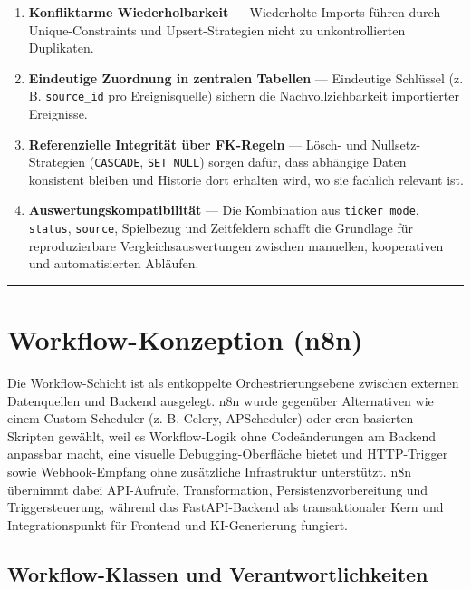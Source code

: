 \begin{enumerate}
\def\labelenumi{\arabic{enumi}.}
\tightlist
\item
  \textbf{Konfliktarme Wiederholbarkeit} --- Wiederholte Imports führen
  durch Unique-Constraints und Upsert-Strategien nicht zu
  unkontrollierten Duplikaten.
\item
  \textbf{Eindeutige Zuordnung in zentralen Tabellen} --- Eindeutige
  Schlüssel (z. B. \texttt{source\_id} pro Ereignisquelle) sichern die
  Nachvollziehbarkeit importierter Ereignisse.
\item
  \textbf{Referenzielle Integrität über FK-Regeln} --- Lösch- und
  Nullsetz-Strategien (\texttt{CASCADE}, \texttt{SET\ NULL}) sorgen
  dafür, dass abhängige Daten konsistent bleiben und Historie dort
  erhalten wird, wo sie fachlich relevant ist.
\item
  \textbf{Auswertungskompatibilität} --- Die Kombination aus
  \texttt{ticker\_mode}, \texttt{status}, \texttt{source}, Spielbezug
  und Zeitfeldern schafft die Grundlage für reproduzierbare
  Vergleichsauswertungen zwischen manuellen, kooperativen und
  automatisierten Abläufen.
\end{enumerate}

\begin{center}\rule{0.5\linewidth}{0.5pt}\end{center}

\section{Workflow-Konzeption (n8n)}\label{workflow-konzeption-n8n}

Die Workflow-Schicht ist als entkoppelte Orchestrierungsebene zwischen
externen Datenquellen und Backend ausgelegt. n8n wurde gegenüber
Alternativen wie einem Custom-Scheduler (z. B. Celery, APScheduler) oder
cron-basierten Skripten gewählt, weil es Workflow-Logik ohne
Codeänderungen am Backend anpassbar macht, eine visuelle
Debugging-Oberfläche bietet und HTTP-Trigger sowie Webhook-Empfang ohne
zusätzliche Infrastruktur unterstützt. n8n übernimmt dabei API-Aufrufe,
Transformation, Persistenzvorbereitung und Triggersteuerung, während das
FastAPI-Backend als transaktionaler Kern und Integrationspunkt für
Frontend und KI-Generierung fungiert.

\subsection{Workflow-Klassen und
Verantwortlichkeiten}\label{workflow-klassen-und-verantwortlichkeiten}

